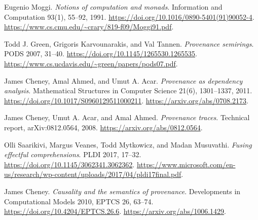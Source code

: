 Eugenio Moggi.
\emph{Notions of computation and monads}.
Information and Computation 93(1), 55--92, 1991.
\url{https://doi.org/10.1016/0890-5401(91)90052-4}.\newline
\url{https://www.cs.cmu.edu/~crary/819-f09/Moggi91.pdf}.

Todd J. Green, Grigoris Karvounarakis, and Val Tannen.
\emph{Provenance semirings}.
PODS 2007, 31--40.
\url{https://doi.org/10.1145/1265530.1265535}.\newline
\url{https://www.cs.ucdavis.edu/~green/papers/pods07.pdf}.

James Cheney, Amal Ahmed, and Umut A. Acar.
\emph{Provenance as dependency analysis}.
Mathematical Structures in Computer Science 21(6), 1301--1337, 2011.
\url{https://doi.org/10.1017/S0960129511000211}.\newline
\url{https://arxiv.org/abs/0708.2173}.

James Cheney, Umut A. Acar, and Amal Ahmed.
\emph{Provenance traces}.
Technical report, arXiv:0812.0564, 2008.
\url{https://arxiv.org/abs/0812.0564}.

Olli Saarikivi, Margus Veanes, Todd Mytkowicz, and Madan Musuvathi.
\emph{Fusing effectful comprehensions}.
PLDI 2017, 17--32.
\url{https://doi.org/10.1145/3062341.3062362}.\newline
\url{https://www.microsoft.com/en-us/research/wp-content/uploads/2017/04/pldi17final.pdf}.

James Cheney.
\emph{Causality and the semantics of provenance}.
Developments in Computational Models 2010, EPTCS 26, 63--74.
\url{https://doi.org/10.4204/EPTCS.26.6}.\newline
\url{https://arxiv.org/abs/1006.1429}.

